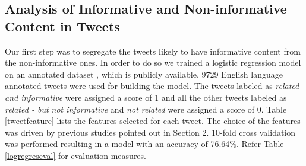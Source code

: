 %

\subsection{Analysis of Informative and Non-informative Content in Tweets} Our first step was to segregate the tweets likely to have informative content from the non-informative ones. In order to do so we trained a logistic regression model on an annotated dataset \cite{olteanu2014crisislex}, which is publicly available. 9729 English language annotated tweets were used for building the model. The tweets labeled as \textit{related and informative} were assigned a score of 1 and all the other tweets labeled as \textit{related - but not informative} and \textit{not related} were assigned a score of 0. Table \ref{tweetfeature} lists the features selected for each tweet. The choice of the features
was driven by previous studies pointed out in Section 2. 10-fold cross validation was performed resulting in a model with an accuracy of 76.64\%. Refer Table \ref{logregreseval} for evaluation measures.

